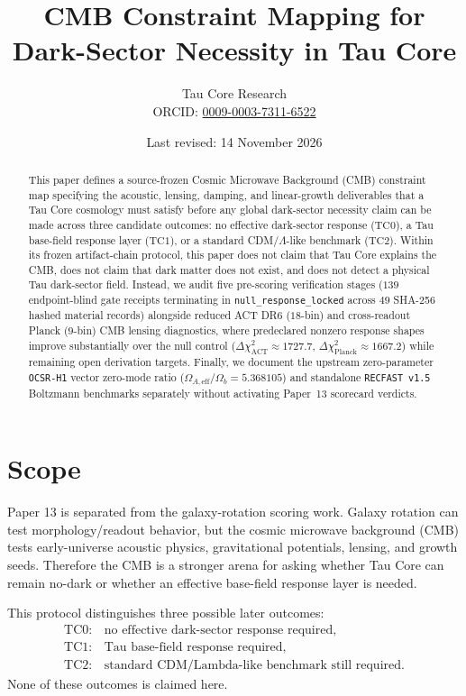 \documentclass[11pt]{article}
\title{CMB Constraint Mapping for Dark-Sector Necessity in Tau Core}
\author{Tau Core Research\\{\small ORCID: \href{https://orcid.org/0009-0003-7311-6522}{0009-0003-7311-6522}}}
\date{Last revised: 14 November 2026}
\begin{document}
\maketitle

\begin{abstract}
This paper defines a source-frozen Cosmic Microwave Background (CMB) constraint map specifying the acoustic, lensing, damping, and linear-growth deliverables that a Tau Core cosmology must satisfy before any global dark-sector necessity claim can be made across three candidate outcomes: no effective dark-sector response ($\mathrm{TC0}$), a Tau base-field response layer ($\mathrm{TC1}$), or a standard CDM/$\Lambda$-like benchmark ($\mathrm{TC2}$). Within its frozen artifact-chain protocol, this paper does not claim that Tau Core explains the CMB, does not claim that dark matter does not exist, and does not detect a physical Tau dark-sector field. Instead, we audit five pre-scoring verification stages ($139$ endpoint-blind gate receipts terminating in \texttt{null\_response\_locked} across $49$ SHA-256 hashed material records) alongside reduced ACT DR6 ($18$-bin) and cross-readout Planck ($9$-bin) CMB lensing diagnostics, where predeclared nonzero response shapes improve substantially over the null control ($\Delta\chi^2_{\mathrm{ACT}}\approx 1727.7$, $\Delta\chi^2_{\mathrm{Planck}}\approx 1667.2$) while remaining open derivation targets. Finally, we document the upstream zero-parameter \texttt{OCSR-H1} vector zero-mode ratio ($\Omega_{A,\mathrm{eff}}/\Omega_b=5.368105$) and standalone \texttt{RECFAST v1.5} Boltzmann benchmarks separately without activating Paper~13 scorecard verdicts.
\end{abstract}

\section{Scope}

Paper 13 is separated from the galaxy-rotation scoring work. Galaxy rotation can
test morphology/readout behavior, but the cosmic microwave background (CMB)
tests early-universe acoustic physics, gravitational potentials, lensing, and
growth seeds. Therefore the CMB is a stronger arena for asking whether Tau Core
can remain no-dark or whether an effective base-field response layer is needed.

This protocol distinguishes three possible later outcomes:
\[
\begin{array}{ll}
\mathrm{TC0}: & \text{no effective dark-sector response required},\\
\mathrm{TC1}: & \text{Tau base-field response required},\\
\mathrm{TC2}: & \text{standard CDM/Lambda-like benchmark still required}.
\end{array}
\]
None of these outcomes is claimed here.
\end{document}
